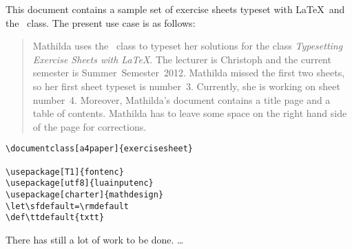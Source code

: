 \documentclass[a4paper]{exercisesheet}
\let\sfdefault=\rmdefault
\def\ttdefault{txtt}
\begin{document}
  \null \vfill

  This document contains a sample set of exercise sheets typeset with
  \LaTeX\ and the \exercisesheet\ class. The present use case is as
  follows:
  \begin{quote}
    Mathilda uses the \exercisesheet\ class to typeset her solutions
    for the class \emph{Typesetting Exercise Sheets with \LaTeX}. The
    lecturer is Christoph and the current semester is
    Summer~Semester~2012. Mathilda missed the first two sheets, so her
    first sheet typeset is number~3. Currently, she is working on
    sheet number~4. Moreover, Mathilda's document contains a title
    page and a table of contents. Mathilda has to leave some space on
    the right hand side of the page for corrections.
  \end{quote}

  \vfill \vfill

  \thispagestyle{empty}
  \setcounter{page}{0}
  \newpage
  
  \maketitle

  \tableofcontents

  \sheet[%
      number=3,
      topic={Using the \exercisesheet\ Class},
      deadline=Deadline: \today,
    ]

  \exercise[%
      topic=Setting up a Basic Template,
      credits=2
    ]

  \blindtext
  
  \begin{lstlisting}
\documentclass[a4paper]{exercisesheet}

\usepackage[T1]{fontenc}
\usepackage[utf8]{luainputenc}
\usepackage[charter]{mathdesign}
\let\sfdefault=\rmdefault
\def\ttdefault{txtt}
  \end{lstlisting}

  \blindtext

  \subexercise[%
      topic=The \lstinline|sheetconf| Command,
      credits=1
    ]
  
  \blindtext

  \exercise[%
      topic=More Stuff,
      credits=8
    ]

  \Blindtext

  \sheet[
      topic={Advanced Topics}
    ]

  There has still a lot of work to be done. \ldots
\end{document}
